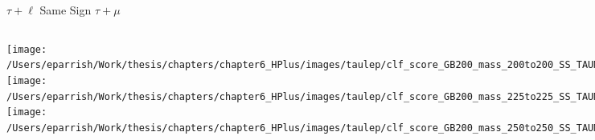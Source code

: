 \documentclass[aspectratio=169,xcolor=table]{beamer}
\begin{document}
    \begin{frame}[t]{$\tau+\ell$ Same Sign $\tau+\mu$}
      \begin{columns}[t]
          \texttt{[image: /Users/eparrish/Work/thesis/chapters/chapter6\_HPlus/images/taulep/clf\_score\_GB200\_mass\_200to200\_SS\_TAUMU.png]}
          \texttt{[image: /Users/eparrish/Work/thesis/chapters/chapter6\_HPlus/images/taulep/clf\_score\_GB200\_mass\_225to225\_SS\_TAUMU.png]}
          \texttt{[image: /Users/eparrish/Work/thesis/chapters/chapter6\_HPlus/images/taulep/clf\_score\_GB200\_mass\_250to250\_SS\_TAUMU.png]}

          \texttt{[image: /Users/eparrish/Work/thesis/chapters/chapter6\_HPlus/images/taulep/clf\_score\_GB200\_mass\_275to275\_SS\_TAUMU.png]}
          \texttt{[image: /Users/eparrish/Work/thesis/chapters/chapter6\_HPlus/images/taulep/clf\_score\_GB200\_mass\_300to300\_SS\_TAUMU.png]}
          \texttt{[image: /Users/eparrish/Work/thesis/chapters/chapter6\_HPlus/images/taulep/clf\_score\_GB200\_mass\_350to350\_SS\_TAUMU.png]}

          \texttt{[image: /Users/eparrish/Work/thesis/chapters/chapter6\_HPlus/images/taulep/clf\_score\_GB200\_mass\_400to400\_SS\_TAUMU.png]}
          \texttt{[image: /Users/eparrish/Work/thesis/chapters/chapter6\_HPlus/images/taulep/clf\_score\_GB200\_mass\_500to500\_SS\_TAUMU.png]}
          \texttt{[image: /Users/eparrish/Work/thesis/chapters/chapter6\_HPlus/images/taulep/clf\_score\_GB200\_mass\_600to600\_SS\_TAUMU.png]}

          \texttt{[image: /Users/eparrish/Work/thesis/chapters/chapter6\_HPlus/images/taulep/clf\_score\_GB200\_mass\_700to700\_SS\_TAUMU.png]}
          \texttt{[image: /Users/eparrish/Work/thesis/chapters/chapter6\_HPlus/images/taulep/clf\_score\_GB200\_mass\_800to800\_SS\_TAUMU.png]}
          \texttt{[image: /Users/eparrish/Work/thesis/chapters/chapter6\_HPlus/images/taulep/clf\_score\_GB200\_mass\_900to900\_SS\_TAUMU.png]}

      \end{columns}
    \end{frame}
\end{document}
